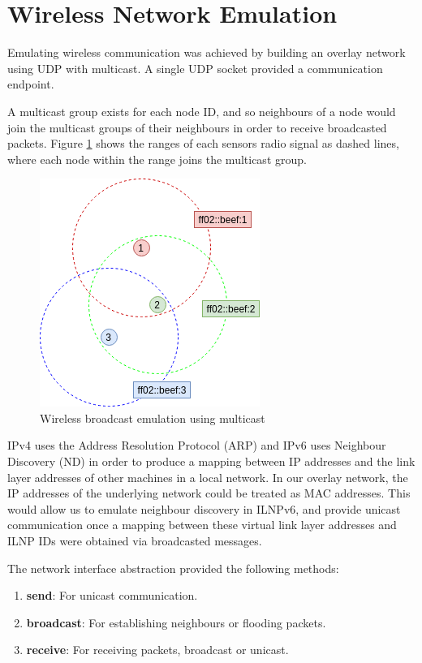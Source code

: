 \documentclass[12pt]{article}
\begin{document}
\section{Wireless Network Emulation}

Emulating wireless communication was achieved by building an overlay network using UDP with multicast. A single UDP socket provided a communication endpoint.

A multicast group exists for each node ID, and so neighbours of a node would join the multicast groups of their neighbours in order to receive broadcasted packets. Figure \ref{fig:mcast} shows the ranges of each sensors radio signal as dashed lines, where each node within the range joins the multicast group.

\begin{figure}[!ht]
	\centering
	\includegraphics[width=0.5\linewidth]{images/mcast}
	\caption{Wireless broadcast emulation using multicast}
	\label{fig:mcast}
\end{figure}

IPv4 uses the Address Resolution Protocol (ARP) and IPv6 uses Neighbour Discovery (ND) in order to produce a mapping between IP addresses and the link layer addresses of other machines in a local network. In our overlay network, the IP addresses of the underlying network could be treated as MAC addresses. This would allow us to emulate neighbour discovery in ILNPv6, and provide unicast communication once a mapping between these virtual link layer addresses and ILNP IDs were obtained via broadcasted messages. 

The network interface abstraction provided the following methods:
\begin{enumerate}
	\item \textbf{send}: For unicast communication.
	\item \textbf{broadcast}: For establishing neighbours or flooding packets.
	\item \textbf{receive}: For receiving packets, broadcast or unicast.
\end{enumerate}
\end{document}
